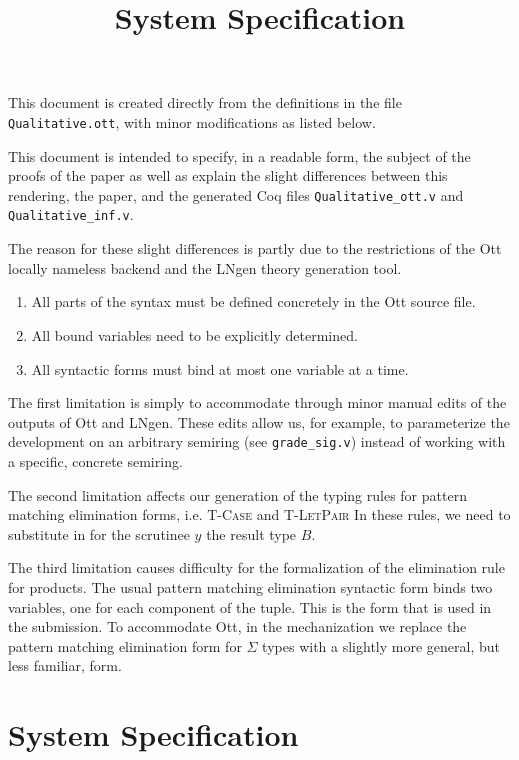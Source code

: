 \documentclass{article}
\title{System Specification}
\begin{document}
\maketitle

This document is created directly from the definitions in the file
{\texttt{Qualitative.ott}}, with minor modifications as listed below.

This document is intended to specify, in a readable form, the subject of the
proofs of the paper as well as explain the slight differences
between this rendering, the paper, and the generated Coq files
\texttt{Qualitative\_ott.v} and \texttt{Qualitative\_inf.v}.

The reason for these slight differences is partly due to the restrictions of
the Ott locally nameless backend and the LNgen theory generation tool.
\begin{enumerate}
\item All parts of the syntax must be defined concretely in the Ott source file. 
\item All bound variables need to be explicitly determined.
\item All syntactic forms must bind at most one variable at a time.
\end{enumerate}

The first limitation is simply to accommodate through minor manual edits of
the outputs of Ott and LNgen. These edits allow us, for example, to
parameterize the development on an arbitrary semiring (see
\texttt{grade\_sig.v}) instead of working with a specific, concrete semiring.

The second limitation affects our generation of the typing rules for pattern
matching elimination forms, i.e. \textsc{T-Case} and \textsc{T-LetPair}
In these rules, we need to substitute in for the scrutinee
$y$ the result type $B$. 

The third limitation causes difficulty for the formalization of the
elimination rule for products. The usual pattern matching elimination
syntactic form binds two variables, one for each component of the tuple. This
is the form that is used in the submission. To accommodate Ott, in the
mechanization we replace the pattern matching elimination form for $\Sigma$
types with a slightly more general, but less familiar, form.

\section{System Specification}
\end{document}
